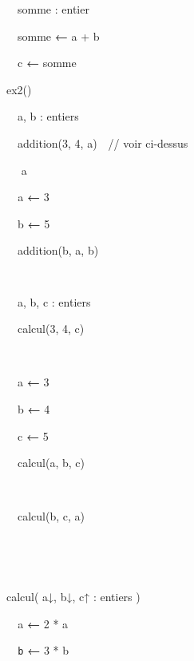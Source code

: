 {{\sffamily
\ \ somme : entier}

{\sffamily
\ \ somme {\textbf{←}}{
a + b}}

{\sffamily
\ \ c {\textbf{←}}{
somme}}

{\sffamily
{}}


\bigskip

{\sffamily
{} ex2()\ \ }

{\sffamily
\ \ a, b : entiers}

{\sffamily
\ \ addition(3, 4, a)\ \ // voir ci-dessus}

{\sffamily
\ \  a}

{\sffamily
\texttt{\ \ }a {\textbf{←}} 3}

{\sffamily
\ \ b {\textbf{←}} 5}

{\sffamily
\ \ addition(b, a, b)}

{\sffamily
\texttt{\ \ }}

{\sffamily
{}}


\bigskip

{\sffamily
{}}

{\sffamily
{\ \ }a, b, c : entiers\ \ \ \ \ \ \ \ }

{\sffamily
\ \ calcul(3, 4, c)\ \ \ \ \ \ \ \ }

{\sffamily
\ \ }

{\sffamily
{\ \ a
}{\textbf{←}}{
3\ \ \ \ \ \ \ \ }}

{\sffamily
{\ \ b
}{\textbf{←}}{ 4}}

{\sffamily
{\ \ c
}{\textbf{←}}{ 5}}

{\sffamily
\ \ calcul(a, b, c)\ \ \ \ \ \ }

{\sffamily
{\ \ }}

{\sffamily
\ \ calcul(b, c, a)\ \ \ \ }

{\sffamily
{\ \ }}

{\sffamily
{}\ \ }


\bigskip

{\sffamily
{} calcul{(
a}{↓}{,
b}{↓}{,
c}{↑ :}{ entiers )}}

{\sffamily
\texttt{\ \ }a {\textbf{←}} 2 * a}

{\sffamily
\texttt{\ \ b} {\textbf{←}} 3 * b}

}
